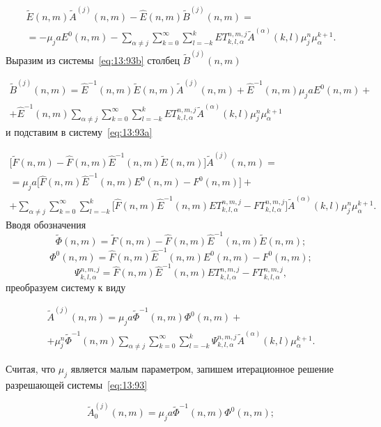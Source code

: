 \begin{multline}
\tilde E(n,m)\tilde A^{(j)}(n,m)-\hat E(n,m)\tilde B^{(j)}(n,m)= \\
=-\mu_j a E^0(n,m)-\sum_{\alpha\neq j}\sum_{k=0}^\infty\sum_{l=-k}^k ET_{k,l,\alpha}^{n,m,j}\tilde A^{(\alpha)}(k,l)\mu_j^n\mu_\alpha^{k+1}.
\label{eq:13:93b}
\end{multline}
Выразим из системы~\eqref{eq:13:93b} столбец $\tilde B^{(j)}(n,m)$

\begin{multline}
\tilde B^{(j)}(n,m)=\hat E^{-1}(n,m)\tilde E(n,m)\tilde A^{(j)}(n,m)+\hat E^{-1}(n,m)\mu_j a E^0(n,m)+ \\
+\hat E^{-1}(n,m)\sum_{\alpha\neq j}\sum_{k=0}^\infty\sum_{l=-k}^k ET_{k,l,\alpha}^{n,m,j}\tilde A^{(\alpha)}(k,l)\mu_j^n\mu_\alpha^{k+1}
\label{eq:13:93c}
\end{multline}
и подставим в систему~\eqref{eq:13:93a}

\begin{multline}
\bigg[\tilde F(n,m)-\hat F(n,m)\hat E^{-1}(n,m)\tilde E(n,m)\bigg]
\tilde A^{(j)}(n,m)= \\
=\mu_j a \bigg[\hat F(n,m)\hat E^{-1}(n,m)E^0(n,m)-F^0(n,m)\bigg]+ \\
+\sum_{\alpha\neq j}\sum_{k=0}^\infty\sum_{l=-k}^k\bigg[\hat F(n,m)\hat E^{-1}(n,m)ET_{k,l,\alpha}^{n,m,j}-FT_{k,l,\alpha}^{n,m,j}\bigg]\tilde A^{(\alpha)}(k,l)\mu_j^n\mu_\alpha^{k+1}.
\label{eq:13:93d}
\end{multline}
Вводя обозначения
$$
\tilde\Phi(n,m)=\tilde F(n,m)-\hat F(n,m)\hat E^{-1}(n,m)\tilde E(n,m);
$$
$$
\Phi^0(n,m)=\hat F(n,m)\hat E^{-1}(n,m)E^0(n,m)-F^0(n,m);
$$
$$
\Psi_{k,l,\alpha}^{n,m,j}=\hat F(n,m)\hat E^{-1}(n,m)ET_{k,l,\alpha}^{n,m,j}-FT_{k,l,\alpha}^{n,m,j},
$$
преобразуем систему к виду

\begin{multline}
\tilde A^{(j)}(n,m)=\mu_j a \tilde\Phi^{-1}(n,m)\Phi^0(n,m)+ \\
+\mu_j^n\tilde\Phi^{-1}(n,m)\sum_{\alpha\neq j}\sum_{k=0}^\infty\sum_{l=-k}^k \Psi_{k,l,\alpha}^{n,m,j}\tilde A^{(\alpha)}(k,l)\mu_\alpha^{k+1}.
\label{eq:13:93}
\end{multline}

Считая, что $\mu_j$ является малым параметром, запишем итерационное решение разрешающей системы~\eqref{eq:13:93}

\begin{equation}
\tilde A_0^{(j)}(n,m)=\mu_j a \tilde\Phi^{-1}(n,m)\Phi^0(n,m);
\label{eq:13:94}
\end{equation}

